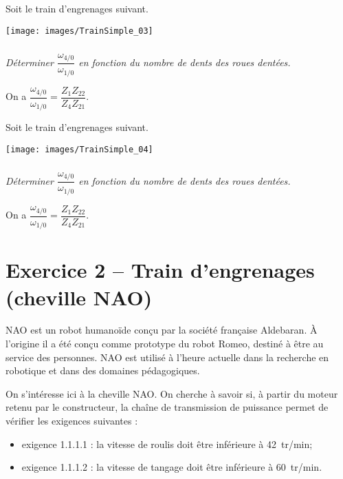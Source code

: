 \documentclass[10pt,fleqn]{article} %
\begin{document}
\begin{multicols}{2}
\begin{multicols}{2}
\ifprof
\else
Soit le train d'engrenages suivant. 
\begin{center}
\texttt{[image: images/TrainSimple\_03]}
\end{center}
\fi


\subparagraph{}
\textit{Déterminer $\dfrac{\omega_{4/0}}{\omega_{1/0}}$ en fonction du nombre de dents des roues dentées.}
\ifprof
\begin{corrige}
On a $\dfrac{\omega_{4/0}}{\omega_{1/0}}=\dfrac{Z_1Z_{22}}{Z_4Z_{21}}$.
\end{corrige}
\else
\fi


\ifprof
\else
Soit le train d'engrenages suivant. 
\begin{center}
\texttt{[image: images/TrainSimple\_04]}
\end{center}
\fi


\subparagraph{}
\textit{Déterminer $\dfrac{\omega_{4/0}}{\omega_{1/0}}$ en fonction du nombre de dents des roues dentées.}
\ifprof
\begin{corrige}
On a $\dfrac{\omega_{4/0}}{\omega_{1/0}}=\dfrac{Z_1Z_{22}}{Z_4Z_{21}}$.
\end{corrige}
\else
\fi




\section*{Exercice 2 -- Train d'engrenages (cheville NAO)}
\setcounter{exo}{0}


\ifprof
\else
NAO est un robot humanoïde conçu par la société française Aldebaran. À l'origine il a été conçu comme prototype du robot Romeo, destiné à être au service des personnes. NAO est utilisé à l'heure actuelle dans la recherche en robotique et dans des domaines pédagogiques. 
\begin{obj}
On s'intéresse ici à la cheville NAO. On cherche à savoir si, à partir du moteur retenu par le constructeur, la chaîne de transmission de puissance permet de vérifier les exigences suivantes : 
\begin{itemize}
\item exigence 1.1.1.1 : la vitesse de roulis doit être inférieure à \SI{42}{tr/min};
\item exigence 1.1.1.2 : la vitesse de tangage doit être inférieure à \SI{60}{tr/min}.
\end{itemize}

\end{obj}




\end{multicols}
\end{multicols}
\end{document}
